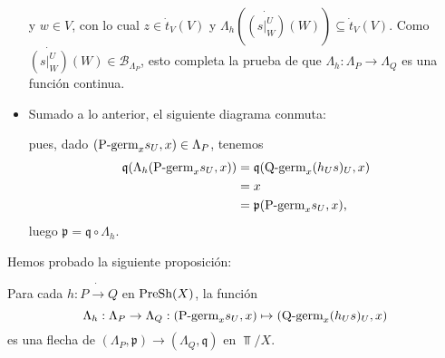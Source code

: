 \begin{itemize}
$$      $$
      y $w\in V$, con lo cual $z\in\dot{t}_{V}(V)$ y $\Lambda_h(\dot{(s|^{U}_{W})}(W))\subseteq \dot{t}_{V}(V)$. Como $\dot{(s|^{U}_{W})}(W)\in\mathcal{B}_{\Lambda_P}$, esto completa la prueba de que $\Lambda_h:\Lambda_P\to \Lambda_Q$ es una función continua.
   \item Sumado a lo anterior, el siguiente diagrama conmuta:
      
      pues, dado $(\normalfont{\text{P-germ}}_{x}s_{U},x)\in \Lambda_P$, tenemos
      $$
      \begin{aligned}
         \mathfrak{q}(\Lambda_h(\normalfont{\text{P-germ}}_{x}s_{U},x))&=\mathfrak{q}(\normalfont{\text{Q-germ}}_{x}(h_{U}s)_{U},x)\\
                                                   &=x\\
                                                   &=\mathfrak{p}(\normalfont{\text{P-germ}}_{x}s_{U},x),
      \end{aligned}
      $$
      luego $\mathfrak{p}=\mathfrak{q}\circ\Lambda_h$.
\end{itemize}
Hemos probado la siguiente proposición:
\begin{Prop}
   Para cada $h:P\dot{\to} Q$ en $\normalfont{\text{PreSh}}(X)$, la función 
   $$
      \Lambda_h:\Lambda_P\to \Lambda_Q:(\normalfont{\text{P-germ}}_{x}s_{U},x)\mapsto (\normalfont{\text{Q-germ}}_{x}(h_{U}s)_{U},x)
   $$
   es una flecha de $(\Lambda_P,\mathfrak{p})\to(\Lambda_Q,\mathfrak{q})$ en $\Top/X$.
\end{Prop}

